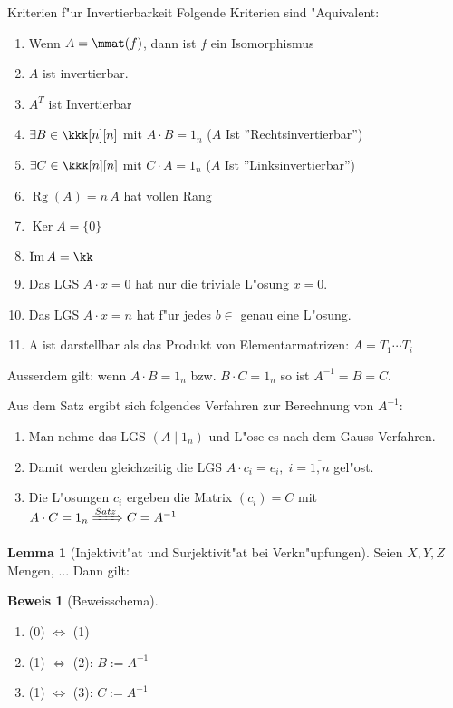 \documentclass[oneside,fontsize=11pt,paper=a4,BCOR=0mm,DIV=12,automark,headsepline]{scrbook}
\DeclareMathOperator{\mKer}{Ker}
\DeclareMathOperator{\mIm}{Im}
\DeclareMathOperator{\mRg}{Rg}
\theoremstyle{remark}
\theoremstyle{definition}
\newtheorem{lemma}{Lemma}[section]
\theoremstyle{definition}
\newtheorem*{prof}{Beweis}
\theoremstyle{remark}
\begin{document}
\begin{satz}{Kriterien f"ur Invertierbarkeit}{}
	Folgende Kriterien sind "Aquivalent:
  \begin{enumerate}
	\item Wenn $A=\mmat(f)$, dann ist $f$ ein Isomorphismus
	\item $A$ ist invertierbar.
	\item $A^T$ ist Invertierbar
	\item $\exists B\in \kkk[n][n]$ mit  $A\cdot B = 1_n$ ($A$ Ist ''Rechtsinvertierbar'')
	\item $\exists C\in \kkk[n][n]$ mit  $C\cdot A = 1_n$ ($A$ Ist ''Linksinvertierbar'')
	\item $\mRg(A) = n\, A$ hat vollen Rang
	\item $\mKer A = \{0\}$
	\item $\mIm A = \kk$
	\item Das LGS $A\cdot x = 0$ hat nur die triviale L"osung $x=0$.
	\item Das LGS $A\cdot x = n$ hat f"ur jedes $b\in $ genau eine L"osung.
	\item A ist darstellbar als das Produkt von Elementarmatrizen: $A=T_1 \cdots T_i$
\end{enumerate}
\vspace{\baselineskip}
Ausserdem gilt: wenn $A\cdot B = 1_n$ bzw. $B\cdot C = 1_n$ so ist $A^{-1} =  B = C$.
\end{satz}

\begin{relation}
Aus dem Satz ergibt sich folgendes Verfahren zur Berechnung von $A^{-1}$:
\begin{enumerate}
\item Man nehme das LGS $(A\mid 1_n)$ und L"ose es nach dem Gauss Verfahren.
\item Damit werden gleichzeitig die LGS $A\cdot c_i = e_i,\; i=\overline{1,n}$ gel"ost.
\item Die L"osungen $c_i$ ergeben die Matrix $(c_i)=C$ mit $A\cdot C = 1_n \xRightarrow{Satz} C=A^{-1}$
\end{enumerate}
\end{relation}

\begin{lemma}[Injektivit"at und Surjektivit"at bei Verkn"upfungen]
  Seien $X,Y,Z$ Mengen, ... Dann gilt:  
\end{lemma}

\begin{prof}[Beweisschema]
  \begin{enumerate}
  \item (0) $ \iff $ (1)
  \item (1) $ \iff $ (2): $B:=A^{-1}$
  \item (1) $ \iff $ (3): $C:=A^{-1}$
  \end{enumerate}
\end{prof}
\end{document}
